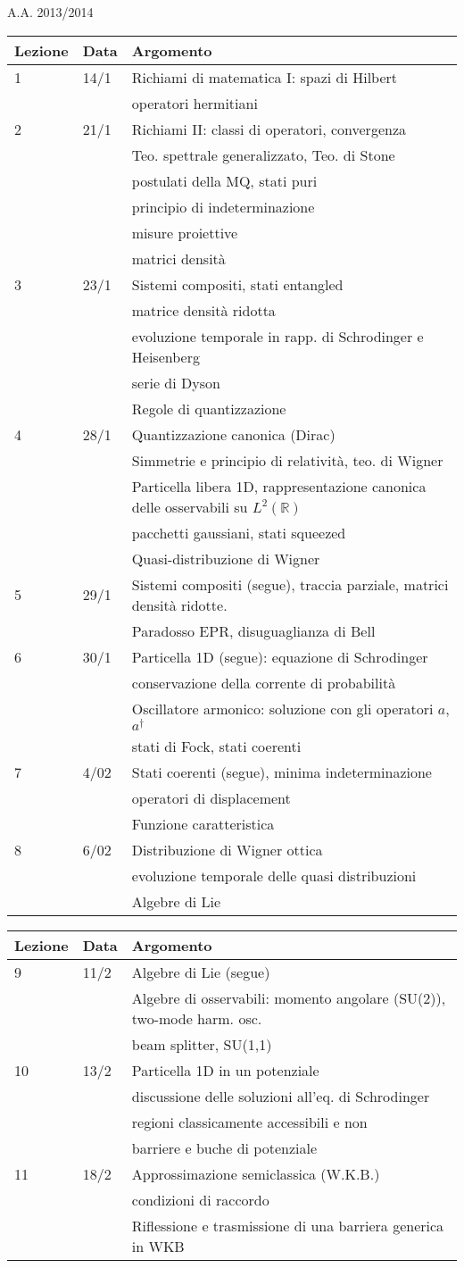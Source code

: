 \documentclass[a4paper, 12pt]{article}
\newcommand{\nl}{\\ & & }
\newcommand{\nr}{\\ \midrule}
\begin{document}
\begin{section}{A.A. 2013/2014}
\centering
\begin{tabular}{lll}
\toprule
Lezione & Data & Argomento\nr

1 & 14/1 & Richiami di matematica I: spazi di Hilbert \nl operatori hermitiani\nr
 
2 & 21/1 & Richiami II: classi di operatori, convergenza \nl Teo. spettrale generalizzato, Teo. di Stone\nl postulati della MQ, stati puri \nl principio di indeterminazione \nl misure proiettive \nl matrici densità\nr

3 & 23/1 & Sistemi compositi, stati entangled\nl matrice densità ridotta \nl evoluzione temporale in rapp. di Schrodinger e Heisenberg\nl serie di Dyson\nl Regole di quantizzazione \nr

4 & 28/1 & Quantizzazione canonica (Dirac)\nl Simmetrie e principio di relatività, teo. di Wigner\nl Particella libera 1D, rappresentazione canonica delle osservabili su $L^2(\mathbb{R})$ \nl pacchetti gaussiani, stati squeezed\nl Quasi-distribuzione di Wigner\nr

5 & 29/1 & Sistemi compositi (segue), traccia parziale, matrici densità ridotte.\nl
Paradosso EPR, disuguaglianza di Bell\nr

6 & 30/1 & Particella 1D (segue): equazione di Schrodinger\nl conservazione della corrente di probabilità\nl Oscillatore armonico: soluzione con gli operatori $a$, $a^\dagger$\nl stati di Fock, stati coerenti\nr

7 & 4/02 & Stati coerenti (segue), minima indeterminazione\nl operatori di displacement\nl Funzione caratteristica\nr

8 & 6/02 & Distribuzione di Wigner ottica\nl evoluzione temporale delle quasi distribuzioni\nl Algebre di Lie \nr


\end{tabular}

\begin{tabular}{lll}
Lezione & Data & Argomento\nr

9 & 11/2 & Algebre di Lie (segue) \nl Algebre di osservabili: momento angolare (SU(2)), two-mode harm. osc.\nl beam splitter, SU(1,1)\nr

10 & 13/2 & Particella 1D in un potenziale\nl discussione delle soluzioni all'eq. di Schrodinger\nl regioni classicamente accessibili e non\nl barriere e buche di potenziale\nr

11 & 18/2 & Approssimazione semiclassica (W.K.B.)\nl condizioni di raccordo\nl Riflessione e trasmissione di una barriera generica in WKB\nr


\end{tabular}
\end{section}
\end{document}
